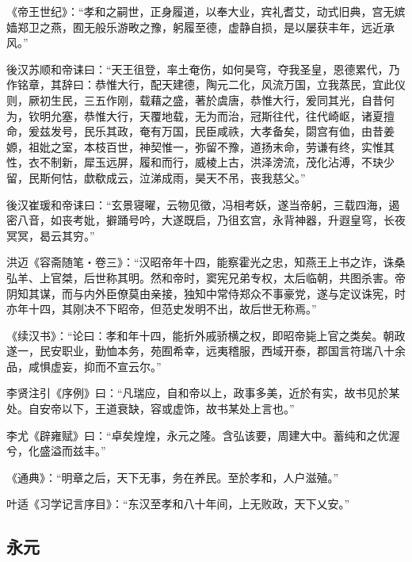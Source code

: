 《帝王世纪》：“孝和之嗣世，正身履道，以奉大业，宾礼耆艾，动式旧典，宫无嫔嫱郑卫之燕，囿无般乐游畋之豫，躬履至德，虚静自损，是以屡获丰年，远近承风。”

後汉苏顺和帝诔曰：“天王徂登，率土奄伤，如何昊穹，夺我圣皇，恩德累代，乃作铭章，其辞曰：恭惟大行，配天建德，陶元二化，风流万国，立我蒸民，宜此仪则，厥初生民，三五作刚，载藉之盛，著於虞唐，恭惟大行，爰同其光，自昔何为，钦明允塞，恭惟大行，天覆地载，无为而治，冠斯往代，往代崎岖，诸夏擅命，爰兹发号，民乐其政，奄有万国，民臣咸祑，大孝备矣，閟宫有侐，由昔姜嫄，祖妣之室，本枝百世，神契惟一，弥留不豫，道扬末命，劳谦有终，实惟其性，衣不制新，犀玉远屏，履和而行，威棱上古，洪泽滂流，茂化沾溥，不玦少留，民斯何怙，歔欷成云，泣涕成雨，昊天不吊，丧我慈父。”

後汉崔瑗和帝诔曰：“玄景寝曜，云物见徵，冯相考妖，遂当帝躬，三载四海，遏密八音，如丧考妣，擗踊号吟，大遂既启，乃徂玄宫，永背神器，升遐皇穹，长夜冥冥，曷云其穷。”

洪迈《容斋随笔‧卷三》：“汉昭帝年十四，能察霍光之忠，知燕王上书之诈，诛桑弘羊、上官桀，后世称其明。然和帝时，窦宪兄弟专权，太后临朝，共图杀害。帝阴知其谋，而与内外臣僚莫由亲接，独知中常侍郑众不事豪党，遂与定议诛宪，时亦年十四，其刚决不下昭帝，但范史发明不出，故后世无称焉。”

《续汉书》：“论曰：孝和年十四，能折外戚骄横之权，即昭帝毙上官之类矣。朝政遂一，民安职业，勤恤本务，苑囿希幸，远夷稽服，西域开泰，郡国言符瑞八十余品，咸惧虚妄，抑而不宣云尔。”

李贤注引《序例》曰：“凡瑞应，自和帝以上，政事多美，近於有实，故书见於某处。自安帝以下，王道衰缺，容或虚饰，故书某处上言也。”

李尤《辟雍赋》曰：“卓矣煌煌，永元之隆。含弘该要，周建大中。蓄纯和之优渥兮，化盛溢而兹丰。”

《通典》：“明章之后，天下无事，务在养民。至於孝和，人户滋殖。”

叶适《习学记言序目》：“东汉至孝和八十年间，上无败政，天下乂安。”

\subsection{永元}

